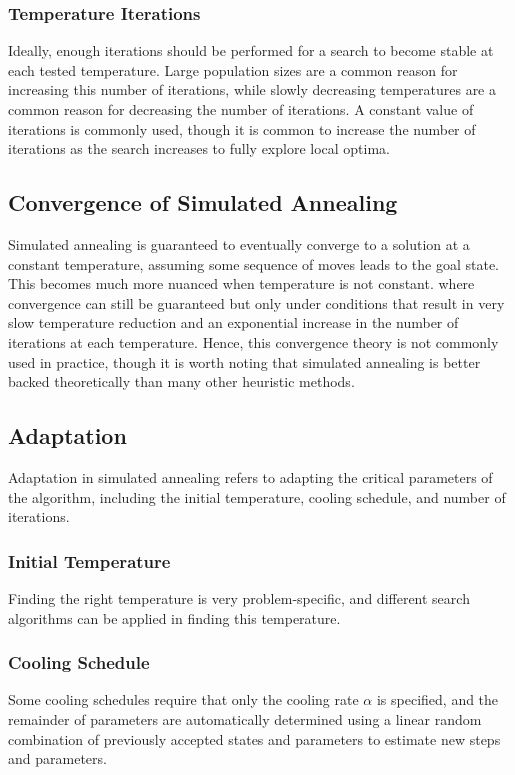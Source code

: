\documentclass[12pt,titlepage]{article}
\begin{document}
      \subsubsection{Temperature Iterations}
        Ideally, enough iterations should be performed for a search to become stable at each tested temperature. Large population sizes are a common reason for increasing this number
        of iterations, while slowly decreasing temperatures are a common reason for decreasing the number of iterations. A constant value of iterations is commonly used, though
        it is common to increase the number of iterations as the search increases to fully explore local optima.

    \subsection{Convergence of Simulated Annealing}
      Simulated annealing is guaranteed to eventually converge to a solution at a constant temperature, assuming some sequence of moves leads to the goal state. This becomes much
      more nuanced when temperature is not constant. where convergence can still be guaranteed but only under conditions that result in very slow temperature reduction and an
      exponential increase in the number of iterations at each temperature. Hence, this convergence theory is not commonly used in practice, though it is worth noting that
      simulated annealing is better backed theoretically than many other heuristic methods.

    \subsection{Adaptation}
      Adaptation in simulated annealing refers to adapting the critical parameters of the algorithm, including the initial temperature, cooling schedule, and number of iterations.

      \subsubsection{Initial Temperature}
        Finding the right temperature is very problem-specific, and different search algorithms can be applied in finding this temperature.

      \subsubsection{Cooling Schedule}
        Some cooling schedules require that only the cooling rate $\alpha$ is specified, and the remainder of parameters are automatically determined using a linear random combination
        of previously accepted states and parameters to estimate new steps and parameters.
\end{document}
